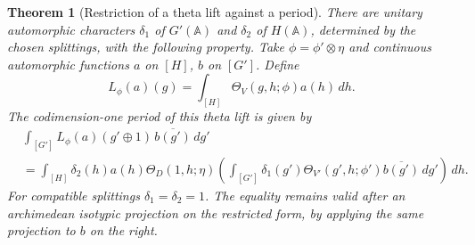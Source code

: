 \documentclass[a4paper,11pt]{article}
\newtheorem{theorem}[proposition]{Theorem}
\theoremstyle{definition}
\theoremstyle{remark}
\numberwithin{equation}{section}
\begin{document}
\begin{theorem}[Restriction of a theta lift against a period]\label{thm:seesaw}
There are unitary automorphic characters \(\delta_1\) of \(G'(\mathbb A)\) and \(\delta_2\) of \(H(\mathbb A)\), determined by the chosen splittings, with the following property. Take \(\phi=\phi'\otimes\eta\) and continuous automorphic functions \(a\) on \([H]\), \(b\) on \([G']\). Define
\[
 L_\phi(a)(g)=\int_{[H]}\Theta_V(g,h;\phi)a(h)\,dh .
\]
The codimension-one period of this theta lift is given by
\begin{equation}
 \begin{split}
 &\int_{[G']} L_\phi(a)(g'\oplus1)\,\overline{b(g')}\,dg'\\
 &=\int_{[H]}\delta_2(h)a(h)\Theta_D(1,h;\eta)
       \left(\int_{[G']}\delta_1(g')\Theta_{V'}(g',h;\phi')
                           \overline{b(g')}\,dg'\right)\,dh .
 \end{split}\label{eq:seesaw}
\end{equation}
For compatible splittings \(\delta_1=\delta_2=1\). The equality remains valid after an archimedean isotypic projection on the restricted form, by applying the same projection to \(b\) on the right.
\end{theorem}
\end{document}
